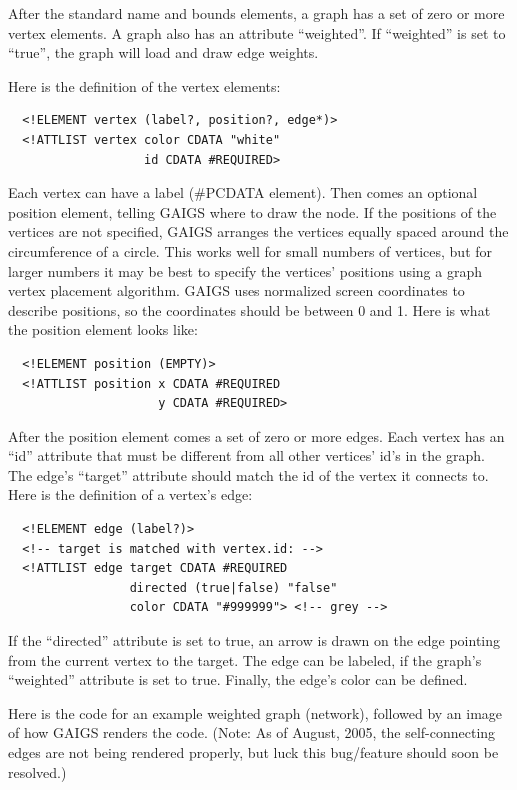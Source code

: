 \documentclass[11pt,letterpaper]{book}
\begin{document}
After the standard name and bounds elements, a graph has a set of zero
or more vertex elements. A graph also has an attribute ``weighted''.
If ``weighted'' is set to ``true'', the graph will load and draw edge
weights.

Here is the definition of the vertex elements:

\footnotesize \begin{verbatim}
  <!ELEMENT vertex (label?, position?, edge*)>
  <!ATTLIST vertex color CDATA "white"
                   id CDATA #REQUIRED>
\end{verbatim} \normalsize
  
  Each vertex can have a label (\#PCDATA element). Then comes an
  optional position element, telling GAIGS where to draw the node. If
  the positions of the vertices are not specified, GAIGS arranges the
  vertices equally spaced around the circumference of a circle. This
  works well for small numbers of vertices, but for larger numbers it
  may be best to specify the vertices' positions using a graph vertex
  placement algorithm. GAIGS uses normalized screen coordinates to
  describe positions, so the coordinates should be between 0 and 1.
  Here is what the position element looks like:

\footnotesize \begin{verbatim}
  <!ELEMENT position (EMPTY)>
  <!ATTLIST position x CDATA #REQUIRED
                     y CDATA #REQUIRED>
\end{verbatim} \normalsize

After the position element comes a set of zero or more edges. Each
vertex has an ``id'' attribute that must be different from all other
vertices' id's in the graph. The edge's ``target'' attribute should
match the id of the vertex it connects to. Here is the definition of a
vertex's edge:

\footnotesize \begin{verbatim}
  <!ELEMENT edge (label?)>
  <!-- target is matched with vertex.id: -->
  <!ATTLIST edge target CDATA #REQUIRED
                 directed (true|false) "false"
                 color CDATA "#999999"> <!-- grey -->
\end{verbatim} \normalsize

If the ``directed'' attribute is set to true, an arrow is drawn on the
edge pointing from the current vertex to the target. The edge can be
labeled, if the graph's ``weighted'' attribute is set to true.
Finally, the edge's color can be defined.

Here is the code for an example weighted graph (network), followed by
an image of how GAIGS renders the code. (Note: As of August, 2005, the
self-connecting edges are not being rendered properly, but 
luck this bug/feature should soon be resolved.)
\end{document}
